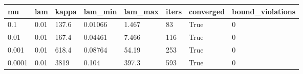 \begin{tabular}{llllllll}
\hline
mu & lam & kappa & lam\_min & lam\_max & iters & converged & bound\_violations \\
\hline
0.1 & 0.01 & 137.6 & 0.01066 & 1.467 & 83 & True & 0 \\
0.01 & 0.01 & 167.4 & 0.04461 & 7.466 & 116 & True & 0 \\
0.001 & 0.01 & 618.4 & 0.08764 & 54.19 & 253 & True & 0 \\
0.0001 & 0.01 & 3819 & 0.104 & 397.3 & 593 & True & 0 \\
\hline
\end{tabular}
